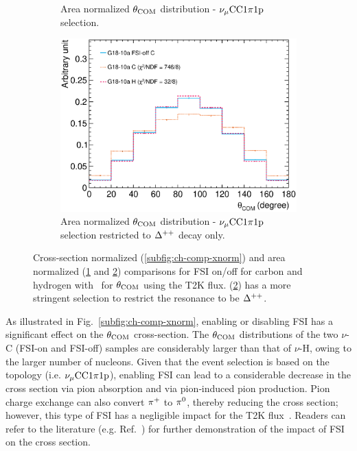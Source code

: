 \begin{figure}
\begin{subfigure}[ht!]{\trfigwid\textwidth}
          \caption{Area normalized $\theta_{\textrm{COM}}$ distribution - $\nu_{\mu}\textrm{CC}1\pi1\textrm{p}$ selection.}
          \label{subfig:ch-comp-com-cc1pi1p}
     \end{subfigure}
     \begin{subfigure}[ht!]{\trfigwid\textwidth}
          \centering
          \includegraphics[width=\textwidth]{figures/COM/anorm-CH-lfgdef-resonly_da_tan.eps}  
          \caption{Area normalized $\theta_{\textrm{COM}}$ distribution - $\nu_{\mu}\textrm{CC}1\pi1\textrm{p}$ selection restricted to $\Delta^{++}$ decay only.}
          \label{subfig:ch-comp-com-dpp}
     \end{subfigure}
     \caption{Cross-section normalized (\ref{subfig:ch-comp-xnorm}) and area normalized (\ref{subfig:ch-comp-com-cc1pi1p} and \ref{subfig:ch-comp-com-dpp}) comparisons for FSI on/off for carbon and hydrogen with \geta\ for $\theta_{\textrm{COM}}$ using the T2K flux. (\ref{subfig:ch-comp-com-dpp}) has a more stringent selection to restrict the resonance to be $\Delta^{++}$.}
     \label{fig:ch-comp}
     \end{figure}

     As illustrated in Fig.~\ref{subfig:ch-comp-xnorm}, enabling or disabling FSI has a significant effect on the $\theta_{\textrm{COM}}$ cross-section.
     The $\theta_{\textrm{COM}}$ distributions of the two $\nu$-C (FSI-on and FSI-off) samples are considerably larger than that of $\nu$-H, owing to the larger number of nucleons.
     Given that the event selection is based on the topology (i.e. $\nu_{\mu}\textrm{CC}1\pi1\textrm{p}$), enabling FSI can lead to a considerable decrease in the cross section via pion absorption and via pion‐induced pion production.
     Pion charge exchange can also convert $\pi^+$ to $\pi^0$, thereby reducing the cross section; however, this type of FSI has a negligible impact for the T2K flux~\cite{GENIE:2024ufm}.
     Readers can refer to the literature (e.g. Ref.~\cite{Filali:2024vpy}) for further demonstration of the impact of FSI on the cross section.


